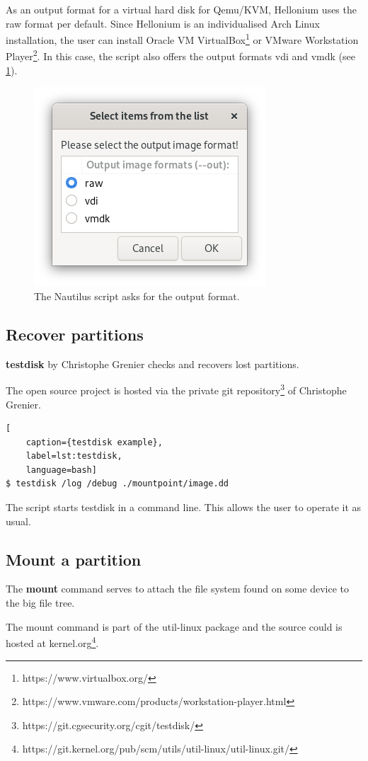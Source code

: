 As an output format for a virtual hard disk for Qemu/KVM, Hellonium uses the raw format per default.
Since Hellonium is an individualised Arch Linux installation, the user can install Oracle VM VirtualBox\footnote{https://www.virtualbox.org/} or VMware Workstation Player\footnote{https://www.vmware.com/products/workstation-player.html}. In this case, the script also offers the output formats vdi and vmdk (see \cref{fig:xmount}).

\begin{figure}[htbp]  %
  \centering
  \includegraphics[width=.25\textwidth]{figures/xmount.png}
  \caption[xmount output format]{The Nautilus script asks for the output format.}
  \label{fig:xmount}
\end{figure}

\subsection{Recover partitions}

\textbf{testdisk} by Christophe Grenier checks and recovers lost partitions.

The open source project is hosted via the private git repository\footnote{https://git.cgsecurity.org/cgit/testdisk/} of Christophe Grenier.

\begin{lstlisting}[
    caption={testdisk example},
    label=lst:testdisk,
    language=bash]
$ testdisk /log /debug ./mountpoint/image.dd
\end{lstlisting}

The script starts testdisk in a command line. This allows the user to operate it as usual.

\subsection{Mount a partition}

The \textbf{mount} command serves to attach the file system found on some device to the big file tree.

The mount command is part of the util-linux package and the source could is hosted at kernel.org\footnote{https://git.kernel.org/pub/scm/utils/util-linux/util-linux.git/}.

